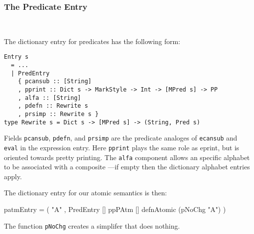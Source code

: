 \subsubsection{The Predicate Entry}~

The dictionary entry for predicates has the following form:
\begin{verbatim}
Entry s
  = ...
  | PredEntry
    { pcansub :: [String]
    , pprint :: Dict s -> MarkStyle -> Int -> [MPred s] -> PP
    , alfa :: [String]
    , pdefn :: Rewrite s
    , prsimp :: Rewrite s }
type Rewrite s = Dict s -> [MPred s] -> (String, Pred s)
\end{verbatim}
Fields \texttt{pcansub}, \texttt{pdefn}, 
and \texttt{prsimp} are the predicate analoges
of \texttt{ecansub} and \texttt{eval} in the expression entry.
Here \texttt{pprint} plays the same role as eprint,
but is oriented towards pretty printing.
The \texttt{alfa} component allows an specific alphabet to
be associated with a composite
---if empty then the dictionary alphabet entries apply.

The dictionary entry for our atomic semantics is then:
\begin{code}
patmEntry
 = ( "A"
   , PredEntry [] ppPAtm [] defnAtomic (pNoChg "A") )
\end{code}
The function \texttt{pNoChg} creates a simplifer that does nothing.

